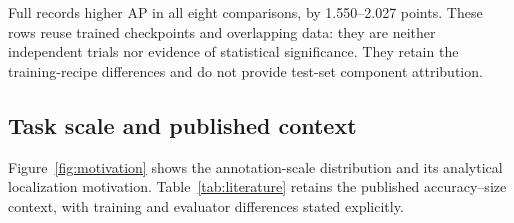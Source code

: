 
\begin{samepage}
Full records higher AP in all eight comparisons, by 1.550--2.027 points. These rows reuse trained checkpoints and overlapping data: they are neither independent trials nor evidence of statistical significance. They retain the training-recipe differences and do not provide test-set component attribution.\par
\end{samepage}

\begin{samepage}
\section{Task scale and published context}
\label{sec:visualcontext}
Figure~\ref{fig:motivation} shows the annotation-scale distribution and its analytical localization motivation. Table~\ref{tab:literature} retains the published accuracy--size context, with training and evaluator differences stated explicitly.\par
\end{samepage}

